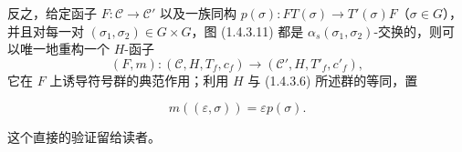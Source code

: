 反之，给定函子 $F\colon\mathcal C\to\mathcal C'$ 以及一族同构
$p(\sigma)\colon FT(\sigma)\to T'(\sigma)F$（$\sigma\in G$），并且对每一对
$(\sigma_1,\sigma_2)\in G\times G$，图 (1.4.3.11) 都是
$\alpha_s(\sigma_1,\sigma_2)$-交换的，则可以唯一地重构一个 $H$-函子
\[
  (F,m)\colon(\mathcal C,H,T_f,c_f)
  \longrightarrow(\mathcal C',H,T'_f,c'_f),
\]
它在 $F$ 上诱导符号群的典范作用；利用 $H$ 与 (1.4.3.6) 所述群的等同，置

\begin{equation}
  m((\varepsilon,\sigma))=\varepsilon p(\sigma).
  \tag{1.4.3.12}
\end{equation}

这个直接的验证留给读者。
